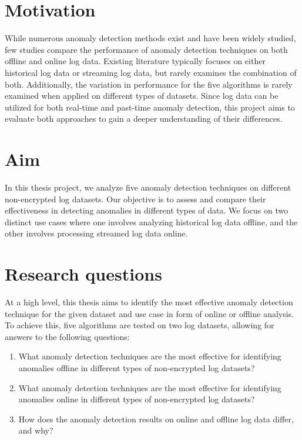 \section{Motivation}
\label{sec:motivation}
While numerous anomaly detection methods exist and have been widely studied, few studies compare the performance of anomaly detection techniques on both offline and online log data. Existing literature typically focuses on either historical log data or streaming log data, but rarely examines the combination of both. Additionally, the variation in performance for the five algorithms is rarely examined when applied on different types of datasets. Since log data can be utilized for both real-time and past-time anomaly detection, this project aims to evaluate both approaches to gain a deeper understanding of their differences.

\section{Aim}
\label{sec:aim}
In this thesis project, we analyze five anomaly detection techniques on different non-encrypted log datasets. Our objective is to assess and compare their effectiveness in detecting anomalies in different types of data. We focus on two distinct use cases where one involves analyzing historical log data offline, and the other involves processing streamed log data online. 

\section{Research questions}
\label{sec:research-questions}
At a high level, this thesis aims to identify the most effective anomaly detection technique for the given dataset and use case in form of online or offline analysis. To achieve this, five algorithms are tested on two log datasets, allowing for answers to the following questions:

\begin{enumerate}
\item What anomaly detection techniques are the most effective for identifying anomalies offline in different types of non-encrypted log datasets?

\item What anomaly detection techniques are the most effective for identifying anomalies online in different types of non-encrypted log datasets?

\item How does the anomaly detection results on online and offline log data differ, and why? 

\end{enumerate}

